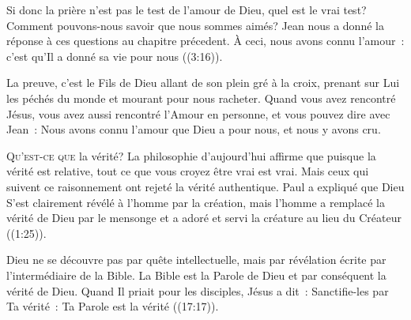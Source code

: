 Si donc la prière n'est pas le test de l'amour de Dieu, quel est le vrai test?
 Comment pouvons-nous savoir que nous sommes aimés?
 Jean nous a donné la réponse à ces questions au chapitre précedent.
 \og À ceci, nous avons connu l'amour~:
 c'est qu'Il a donné sa vie pour nous \fg{} ((3:16)). 


La preuve, c'est le Fils de Dieu allant de son plein gré à la croix,
 prenant sur Lui les péchés du monde et mourant pour nous racheter.
 Quand vous avez rencontré Jésus, vous avez aussi rencontré
 l'Amour en personne, et vous pouvez dire avec Jean~: 
 \og Nous avons connu l'amour que Dieu a pour nous, et nous y avons cru. \fg{}

\dvrule







\lettrine{Q}{u'est-ce que} la vérité?
 La philosophie d'aujourd'hui affirme que 
 \og puisque la vérité est relative, \fg{} 
 tout ce que vous croyez être vrai est vrai.
 Mais ceux qui suivent ce raisonnement ont rejeté la vérité authentique.
 Paul a expliqué que Dieu S'est clairement révélé à l'homme par la création,
 mais l'homme \og a remplacé la vérité de Dieu par le mensonge
 et a adoré et servi la créature au lieu du Créateur \fg{}
 ((1:25)). 


Dieu ne se découvre pas par quête intellectuelle, mais par révélation écrite
 \ocadr par l'intermédiaire de la Bible.
 La Bible est la Parole de Dieu et par conséquent la vérité de Dieu.
 Quand Il priait pour les disciples, Jésus a dit~: 
 \og Sanctifie-les par Ta vérité~: Ta Parole est la vérité \fg{} 
 ((17:17)). 

